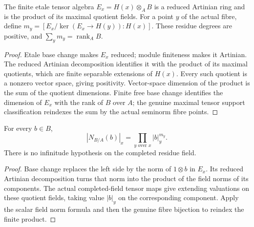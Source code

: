 \begin{theorem}
\label{spectrum:etale-fibre-multiplicities}
\leanok
{}
The finite etale tensor algebra $E_x=H(x)\otimes_A B$ is a reduced
Artinian ring and is the product of its maximal quotient fields.
For a point $y$ of the actual fibre, define
$m_y=[E_x/\ker(E_x\to H(y)):H(x)]$.
These residue degrees are positive, and
$\sum_y m_y=\operatorname{rank}_A B$.
\end{theorem}
\begin{proof}
Etale base change makes $E_x$ reduced; module finiteness makes it
Artinian. The reduced Artinian decomposition identifies it with
the product of its maximal quotients, which are finite separable
extensions of $H(x)$. Every such quotient is a nonzero vector space,
giving positivity. Vector-space dimension of the product is the
sum of the quotient dimensions. Finite free base change identifies
the dimension of $E_x$ with the rank of $B$ over $A$; the genuine
maximal tensor support classification reindexes the sum by the
actual seminorm fibre points.
\end{proof}

\begin{theorem}
\label{spectrum:scalar-etale-norm}
\leanok
{}
For every $b\in B$,
\[
 |N_{B/A}(b)|_x=\prod_{y\text{ over }x}|b|_y^{m_y}.
\]
There is no infinitude hypothesis on the completed residue field.
\end{theorem}
\begin{proof}
Base change replaces the left side by the norm of $1\otimes b$
in $E_x$. Its reduced Artinian decomposition turns that norm into
the product of the field norms of its components. The actual
completed-field tensor maps give extending valuations on these
quotient fields, taking value $|b|_y$ on the corresponding component.
Apply the scalar field norm formula and then the genuine fibre
bijection to reindex the finite product.
\end{proof}

